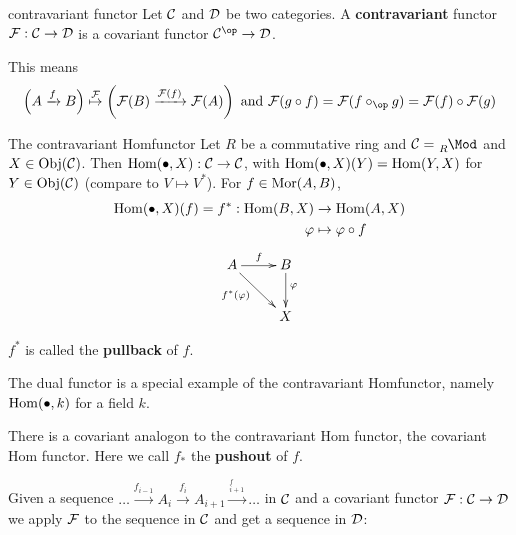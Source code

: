 \documentclass[twoside = false,	%
		headsepline,		%
		parskip = true,
		]{scrbook}						%
\begin{document}
    \begin{definition*}{contravariant functor}
        Let $\mathcal C$ and $\mathcal D$ be two categories. A \textbf{contravariant} functor $\mathcal F: \mathcal C \to \mathcal D$
        is a covariant functor $\cC^\op \to \cD$.
        
        This means
        \begin{equation*}
            \left(A \xrightarrow{f} B\right) \overset{\cF}{\mapsto} \left(\cF(B) \xrightarrow{\cF(f)}\cF(A)\right)
            \text{ and  } \cF(g \circ f) = \cF(f \circ_\op g) = \cF(f) \circ \cF(g)
        \end{equation*}

    \end{definition*}
    
    \begin{example*}{The contravariant Homfunctor}
        Let $R$ be a commutative ring and $\cC = \tensor[_R]{\Mod}{^{}}$ and $X \in \mathrm{Obj}(\mathcal C) $. 
        Then $\mathrm{Hom}(\bullet,X): \mathcal C \to \mathcal C$, with $\mathrm{Hom}(\bullet,X)(Y) = \mathrm{Hom}(Y,X)$ for $Y \in \mathrm{Obj}(\mathcal C)$ (compare to $V \mapsto V^*$).
        For $f \in \mathrm{Mor}(A,B)$,
        \begin{equation*}
            \begin{split}
                \mathrm{Hom}(\bullet,X)(f) = f^*: \mathrm{Hom}(B,X) &\to \mathrm{Hom}(A,X) \\
                \varphi &\mapsto \varphi \circ f  \\
            \end{split}
        \end{equation*}
        \begin{equation*}
            \xymatrix {
                A \ar^{f}[r]\ar_(.4){f^*(\varphi)}[dr] & B\ar^(.4){\varphi}[d] \\
                            & X
            }
        \end{equation*}
        
        $f^*$ is called the \textbf{pullback} of $f$.
    \end{example*}
    
    The dual functor is a special example of the contravariant Homfunctor, namely $\mathrm{Hom}(\bullet,k)$ for a field $k$.
    
    There is a covariant analogon to the contravariant Hom functor, the covariant Hom functor. Here we call $f_*$ the \textbf{pushout} of $f$.
    
    Given a sequence $\dots \xrightarrow{f_{i-1}} A_i \xrightarrow{f_i} A_{i+1} \xrightarrow{^f_{i+1}} \dots$
    in $\mathcal C$ and a covariant functor $\mathcal F: \mathcal C \to \mathcal D$ we apply $\mathcal F$ to the sequence in $\mathcal C$ and
    get a sequence in $\mathcal D$:
        
\end{document}
